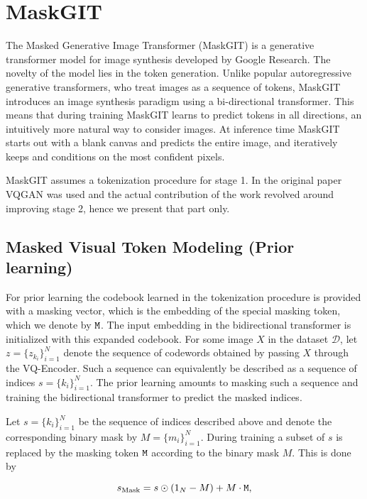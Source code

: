 \documentclass[../../thesis.tex]{subfiles}
\begin{document}
\section{MaskGIT}

The Masked Generative Image Transformer (MaskGIT)\cite{chang2022maskgit} is a generative transformer model for image synthesis developed by Google Research. The novelty of the model lies in the token generation. Unlike popular autoregressive generative transformers, who treat images as a sequence of tokens, MaskGIT introduces an image synthesis paradigm using a bi-directional transformer. This means that during training MaskGIT learns to predict tokens in all directions, an intuitively more natural way to consider images. At inference time MaskGIT starts out with a blank canvas and predicts the entire image, and iteratively keeps and conditions on the most confident pixels.\newline

MaskGIT assumes a tokenization procedure for stage 1. In the original paper \cite{chang2022maskgit} VQGAN \cite{VQGAN} was used and the actual contribution of the work revolved around improving stage 2, hence we present that part only. 

\subsection{Masked Visual Token Modeling (Prior learning)}

For prior learning the codebook learned in the tokenization procedure is provided with a masking vector, which is the embedding of the special masking token, which we denote by $\texttt{M}$. The input embedding in the bidirectional transformer is initialized with this expanded codebook. For some image $X$ in the dataset $\mathcal{D}$, let $z = \{z_{k_i}\}_{i=1}^N$ denote the sequence of codewords obtained by passing $X$ through the VQ-Encoder. Such a sequence can equivalently be described as a sequence of indices $s = \{k_i\}_{i=1}^N$. The prior learning amounts to masking such a sequence and training the bidirectional transformer to predict the masked indices.
\newline

Let $s = \{k_i\}_{i=1}^N$ be the sequence of indices described above and denote the corresponding binary mask by $M = \{m_i\}_{i=1}^N$. During training a subset of $s$ is replaced by the masking token $\texttt{M}$ according to the binary mask $M$. This is done by 

\begin{equation}
    s_\text{Mask} = s\odot (1_N-M) +  M\cdot\texttt{M},
\end{equation}
\end{document}
